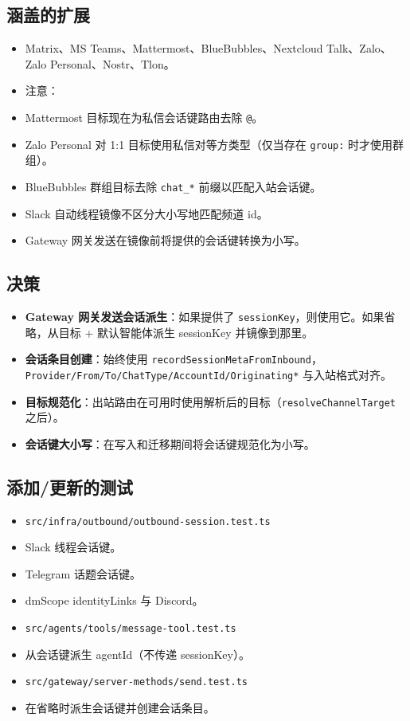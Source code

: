 \subsection{涵盖的扩展}


\begin{itemize}
  \item Matrix、MS Teams、Mattermost、BlueBubbles、Nextcloud Talk、Zalo、Zalo Personal、Nostr、Tlon。
  \item 注意：
  \item Mattermost 目标现在为私信会话键路由去除 \texttt{@}。
  \item Zalo Personal 对 1:1 目标使用私信对等方类型（仅当存在 \texttt{group:} 时才使用群组）。
  \item BlueBubbles 群组目标去除 \texttt{chat\_*} 前缀以匹配入站会话键。
  \item Slack 自动线程镜像不区分大小写地匹配频道 id。
  \item Gateway 网关发送在镜像前将提供的会话键转换为小写。
\end{itemize}


\subsection{决策}


\begin{itemize}
  \item \textbf{Gateway 网关发送会话派生}：如果提供了 \texttt{sessionKey}，则使用它。如果省略，从目标 + 默认智能体派生 sessionKey 并镜像到那里。
  \item \textbf{会话条目创建}：始终使用 \texttt{recordSessionMetaFromInbound}，\texttt{Provider/From/To/ChatType/AccountId/Originating*} 与入站格式对齐。
  \item \textbf{目标规范化}：出站路由在可用时使用解析后的目标（\texttt{resolveChannelTarget} 之后）。
  \item \textbf{会话键大小写}：在写入和迁移期间将会话键规范化为小写。
\end{itemize}


\subsection{添加/更新的测试}


\begin{itemize}
  \item \texttt{src/infra/outbound/outbound-session.test.ts}
  \item Slack 线程会话键。
  \item Telegram 话题会话键。
  \item dmScope identityLinks 与 Discord。
  \item \texttt{src/agents/tools/message-tool.test.ts}
  \item 从会话键派生 agentId（不传递 sessionKey）。
  \item \texttt{src/gateway/server-methods/send.test.ts}
  \item 在省略时派生会话键并创建会话条目。
\end{itemize}


